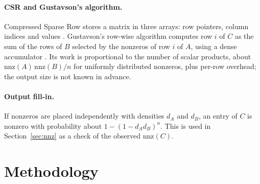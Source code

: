 \documentclass[11pt,a4paper]{article}
\begin{document}
\paragraph{CSR and Gustavson's algorithm.} Compressed Sparse Row stores a matrix in three arrays: row pointers, column indices and values \cite{saad2003}. Gustavson's row-wise algorithm computes row $i$ of $C$ as the sum of the rows of $B$ selected by the nonzeros of row $i$ of $A$, using a dense accumulator \cite{gustavson1978}. Its work is proportional to the number of scalar products, about $\mathrm{nnz}(A)\,\mathrm{nnz}(B)/n$ for uniformly distributed nonzeros, plus per-row overhead; the output size is not known in advance.
\paragraph{Output fill-in.} If nonzeros are placed independently with densities $d_A$ and $d_B$, an entry of $C$ is nonzero with probability about $1-(1-d_Ad_B)^n$. This is used in Section~\ref{sec:nnz} as a check of the observed $\mathrm{nnz}(C)$.

\section{Methodology}
\end{document}
